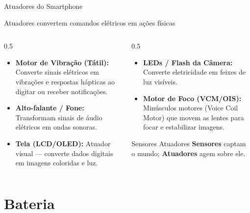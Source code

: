 \documentclass[aspectratio=169]{beamer}
\begin{document}
\begin{frame}{Atuadores do Smartphone}
    \begin{block}{Atuadores convertem comandos elétricos em ações físicas}
    \end{block}
    \vspace{0.4em}
    \begin{columns}[T]
        \begin{column}{0.5\textwidth}
            \begin{itemize}
                \item \textbf{Motor de Vibração (Tátil):} Converte sinais elétricos em vibrações e respostas hápticas ao digitar ou receber notificações.
                \item \textbf{Alto-falante / Fone:} Transformam sinais de áudio elétricos em ondas sonoras.
                \item \textbf{Tela (LCD/OLED):} Atuador visual — converte dados digitais em imagens coloridas e luz.
            \end{itemize}
        \end{column}
        \begin{column}{0.5\textwidth}
            \begin{itemize}
                \item \textbf{LEDs / Flash da Câmera:} Converte eletricidade em feixes de luz visíveis.
                \item \textbf{Motor de Foco (VCM/OIS):} Minúsculos motores (Voice Coil Motor) que movem as lentes para focar e estabilizar imagens.
            \end{itemize}
            \vspace{0.5em}
            \begin{exampleblock}{Sensores \texttimes{} Atuadores}
                \textbf{Sensores} captam o mundo; \textbf{Atuadores} agem sobre ele.
            \end{exampleblock}
        \end{column}
    \end{columns}
\end{frame}

\section{Bateria}
\end{document}
